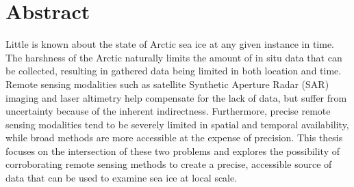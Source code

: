 
\chapter*{Abstract}

\indent Little is known about the state of Arctic sea ice at any given instance in time. The harshness of the Arctic naturally limits the amount of in situ data that can be collected, resulting in gathered data being limited in both location and time. Remote sensing modalities such as satellite Synthetic Aperture Radar (SAR) imaging and laser altimetry help compensate for the lack of data, but suffer from uncertainty because of the inherent indirectness. Furthermore, precise remote sensing modalities tend to be severely limited in spatial and temporal availability, while broad methods are more accessible at the expense of precision. This thesis focuses on the intersection of these two problems and explores the possibility of corroborating remote sensing methods to create a precise, accessible source of data that can be used to examine sea ice at local scale.
\par

